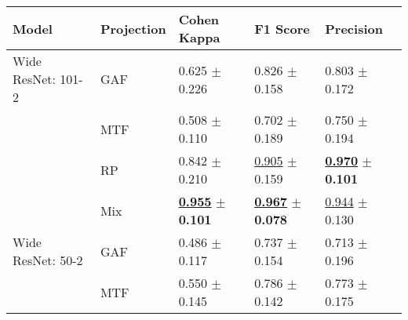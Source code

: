 
\begin{tabular}[t]{lllll}
\toprule
Model & Projection & Cohen Kappa & F1 Score & Precision \\
\midrule
Wide ResNet: 101-2 & GAF & \textcolor[rgb]{0.7035040431,0.2964959569,0}{0.625} $\pm$ \textcolor[rgb]{1.0000000000,0.0000000000,0}{0.226} & \textcolor[rgb]{0.5310457516,0.4689542484,0}{0.826} $\pm$ \textcolor[rgb]{0.7216724410,0.2783275590,0}{0.158} & \textcolor[rgb]{0.6491803279,0.3508196721,0}{0.803} $\pm$ \textcolor[rgb]{0.7480801390,0.2519198610,0}{0.172} \\
 & MTF & \textcolor[rgb]{0.9525606469,0.0474393531,0}{0.508} $\pm$ \textcolor[rgb]{0.0744771966,0.5000000000,0}{0.110} & \textcolor[rgb]{1.0000000000,0.0000000000,0}{0.702} $\pm$ \textcolor[rgb]{1.0000000000,0.0000000000,0}{0.189} & \textcolor[rgb]{0.8557377049,0.1442622951,0}{0.750} $\pm$ \textcolor[rgb]{0.9761302963,0.0238697037,0}{0.194} \\
 & RP & \textcolor[rgb]{0.2409703504,0.5000000000,0}{0.842} $\pm$ \textcolor[rgb]{0.8693186823,0.1306813177,0}{0.210} & \underline{\textcolor[rgb]{0.2320261438,0.5000000000,0}{0.905}} $\pm$ \textcolor[rgb]{0.7291922402,0.2708077598,0}{0.159} & \underline{\textbf{\textcolor[rgb]{0.0000000000,0.5000000000,0}{0.970}}} $\pm$ \textbf{\textcolor[rgb]{0.0000000000,0.5000000000,0}{0.101}} \\
 & Mix & \underline{\textbf{\textcolor[rgb]{0.0000000000,0.5000000000,0}{0.955}}} $\pm$ \textbf{\textcolor[rgb]{0.0000000000,0.5000000000,0}{0.101}} & \underline{\textbf{\textcolor[rgb]{0.0000000000,0.5000000000,0}{0.967}}} $\pm$ \textbf{\textcolor[rgb]{0.0000000000,0.5000000000,0}{0.078}} & \underline{\textcolor[rgb]{0.0983606557,0.5000000000,0}{0.944}} $\pm$ \textcolor[rgb]{0.3064880551,0.5000000000,0}{0.130} \\
Wide ResNet: 50-2 & GAF & \textcolor[rgb]{1.0000000000,0.0000000000,0}{0.486} $\pm$ \textcolor[rgb]{0.1265958779,0.5000000000,0}{0.117} & \textcolor[rgb]{0.8687363834,0.1312636166,0}{0.737} $\pm$ \textcolor[rgb]{0.6890640385,0.3109359615,0}{0.154} & \textcolor[rgb]{1.0000000000,0.0000000000,0}{0.713} $\pm$ \textcolor[rgb]{1.0000000000,0.0000000000,0}{0.196} \\
 & MTF & \textcolor[rgb]{0.8636118598,0.1363881402,0}{0.550} $\pm$ \textcolor[rgb]{0.3477484360,0.5000000000,0}{0.145} & \textcolor[rgb]{0.6830065359,0.3169934641,0}{0.786} $\pm$ \textcolor[rgb]{0.5762344811,0.4237655189,0}{0.142} & \textcolor[rgb]{0.7672131148,0.2327868852,0}{0.773} $\pm$ \textcolor[rgb]{0.7823941516,0.2176058484,0}{0.175} \\

\end{tabular}
